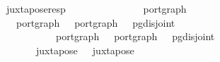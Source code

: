 \ juxtapose{\isacharunderscore}resp{\isacharcolon}\isanewline
\ \ \ \ \ \ \ \ \ \ {\isacharcolon}{\isacharcolon}\ {\isachardoublequoteopen}{\isacharparenleft}\ \ \ \ port{\isacharunderscore}graph{\isachardoublequoteclose}\isanewline
\ \ \ {\isachardoublequoteopen}port{\isacharunderscore}graph\ \ \ {\isachardoublequoteopen}port{\isacharunderscore}graph\ \ \ {\isachardoublequoteopen}pg{\isacharunderscore}disjoint\ \isanewline
\ \ \ \ \ \ \ \ \ \ \ {\isachardoublequoteopen}port{\isacharunderscore}graph\ \ \ {\isachardoublequoteopen}port{\isacharunderscore}graph\ \ \ {\isachardoublequoteopen}pg{\isacharunderscore}disjoint\ \isanewline
\ \ \ \ \ \ \ \ \ \ \ {\isachardoublequoteopen}\ {\isasymapprox}\ \ \ {\isachardoublequoteopen}\ {\isasymapprox}\ \isanewline
\ \ \ \ \ \ \ {\isachardoublequoteopen}juxtapose\ \ {\isasymapprox}\ juxtapose\ 
